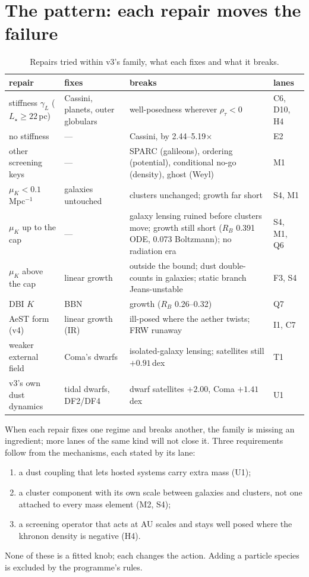 \documentclass[10pt]{article}
\begin{document}
\section{The pattern: each repair moves the failure}
\begin{table}[h]\centering\small
\caption{Repairs tried within v3's family, what each fixes and what it breaks.}\label{tab:repairs}
\begin{tabular}{p{}p{}p{}l}
\toprule
repair & fixes & breaks & lanes\\
\midrule
stiffness $\gamma_L$ ($L_\star\ge22$\,pc) & Cassini, planets, outer globulars & well-posedness wherever $\rho_\tau<0$ & C6, D10, H4\\
no stiffness & --- & Cassini, by 2.44--5.19$\times$ & E2\\
other screening keys & --- & SPARC (galileons), ordering (potential), conditional no-go (density), ghost (Weyl) & M1\\
$\mu_K<0.1$\,Mpc$^{-1}$ & galaxies untouched & clusters unchanged; growth far short & S4, M1\\
$\mu_K$ up to the cap & --- & galaxy lensing ruined before clusters move; growth still short ($R_B$ 0.391 ODE, 0.073 Boltzmann); no radiation era & S4, M1, Q6\\
$\mu_K$ above the cap & linear growth & outside the bound; dust double-counts in galaxies; static branch Jeans-unstable & F3, S4\\
DBI $K$ & BBN & growth ($R_B$ 0.26--0.32) & Q7\\
AeST form (v4) & linear growth (IR) & ill-posed where the aether twists; FRW runaway & I1, C7\\
weaker external field & Coma's dwarfs & isolated-galaxy lensing; satellites still $+0.91$\,dex & T1\\
v3's own dust dynamics & tidal dwarfs, DF2/DF4 & dwarf satellites $+2.00$, Coma $+1.41$\,dex & U1\\
\bottomrule
\end{tabular}
\end{table}

When each repair fixes one regime and breaks another, the family is missing an ingredient; more lanes of the same kind will not close it. Three requirements follow from the mechanisms, each stated by its lane:
\begin{enumerate}
\item a dust coupling that lets hosted systems carry extra mass (U1);
\item a cluster component with its own scale between galaxies and clusters, not one attached to every mass element (M2, S4);
\item a screening operator that acts at AU scales and stays well posed where the khronon density is negative (H4).
\end{enumerate}
None of these is a fitted knob; each changes the action. Adding a particle species is excluded by the programme's rules.
\end{document}
